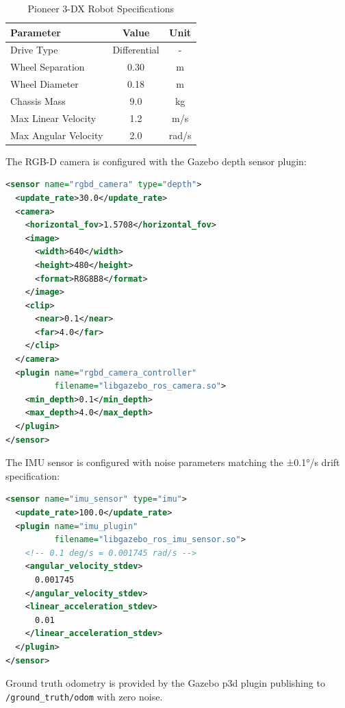\documentclass[conference]{IEEEtran}
\begin{document}
\begin{table}[htbp]
\caption{Pioneer 3-DX Robot Specifications}
\begin{center}
\begin{tabular}{|l|c|c|}
\hline
\textbf{Parameter} & \textbf{Value} & \textbf{Unit} \\
\hline
Drive Type & Differential & - \\
Wheel Separation & 0.30 & m \\
Wheel Diameter & 0.18 & m \\
Chassis Mass & 9.0 & kg \\
Max Linear Velocity & 1.2 & m/s \\
Max Angular Velocity & 2.0 & rad/s \\
\hline
\end{tabular}
\label{tab:robot_specs}
\end{center}
\end{table}

The RGB-D camera is configured with the Gazebo depth sensor plugin:

\begin{lstlisting}[language=XML,caption={RGB-D Camera URDF Configuration}]
<sensor name="rgbd_camera" type="depth">
  <update_rate>30.0</update_rate>
  <camera>
    <horizontal_fov>1.5708</horizontal_fov>
    <image>
      <width>640</width>
      <height>480</height>
      <format>R8G8B8</format>
    </image>
    <clip>
      <near>0.1</near>
      <far>4.0</far>
    </clip>
  </camera>
  <plugin name="rgbd_camera_controller"
          filename="libgazebo_ros_camera.so">
    <min_depth>0.1</min_depth>
    <max_depth>4.0</max_depth>
  </plugin>
</sensor>
\end{lstlisting}

The IMU sensor is configured with noise parameters matching the ±0.1°/s drift specification:

\begin{lstlisting}[language=XML,caption={IMU Sensor Configuration}]
<sensor name="imu_sensor" type="imu">
  <update_rate>100.0</update_rate>
  <plugin name="imu_plugin"
          filename="libgazebo_ros_imu_sensor.so">
    <!-- 0.1 deg/s = 0.001745 rad/s -->
    <angular_velocity_stdev>
      0.001745
    </angular_velocity_stdev>
    <linear_acceleration_stdev>
      0.01
    </linear_acceleration_stdev>
  </plugin>
</sensor>
\end{lstlisting}

Ground truth odometry is provided by the Gazebo p3d plugin publishing to \texttt{/ground\_truth/odom} with zero noise.
\end{document}
